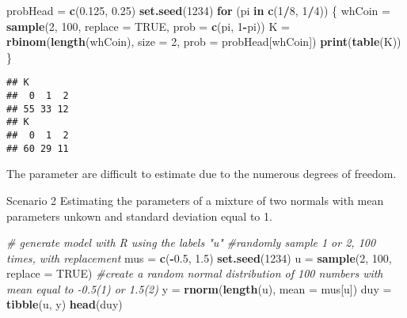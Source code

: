 \documentclass[]{article}
\newenvironment{Shaded}{\begin{snugshade}}{\end{snugshade}}
\newcommand{\CommentTok}[1]{\textcolor[rgb]{0.56,0.35,0.01}{\textit{#1}}}
\newcommand{\ControlFlowTok}[1]{\textcolor[rgb]{0.13,0.29,0.53}{\textbf{#1}}}
\newcommand{\DataTypeTok}[1]{\textcolor[rgb]{0.13,0.29,0.53}{#1}}
\newcommand{\DecValTok}[1]{\textcolor[rgb]{0.00,0.00,0.81}{#1}}
\newcommand{\FloatTok}[1]{\textcolor[rgb]{0.00,0.00,0.81}{#1}}
\newcommand{\KeywordTok}[1]{\textcolor[rgb]{0.13,0.29,0.53}{\textbf{#1}}}
\newcommand{\NormalTok}[1]{#1}
\newcommand{\OperatorTok}[1]{\textcolor[rgb]{0.81,0.36,0.00}{\textbf{#1}}}
\newcommand{\OtherTok}[1]{\textcolor[rgb]{0.56,0.35,0.01}{#1}}
\newcommand{\StringTok}[1]{\textcolor[rgb]{0.31,0.60,0.02}{#1}}
\begin{document}
\begin{Shaded}
\begin{Highlighting}[]
\NormalTok{probHead =}\StringTok{ }\KeywordTok{c}\NormalTok{(}\FloatTok{0.125}\NormalTok{, }\FloatTok{0.25}\NormalTok{)}
\KeywordTok{set.seed}\NormalTok{(}\DecValTok{1234}\NormalTok{)}
\ControlFlowTok{for}\NormalTok{ (pi }\ControlFlowTok{in} \KeywordTok{c}\NormalTok{(}\DecValTok{1}\OperatorTok{/}\DecValTok{8}\NormalTok{, }\DecValTok{1}\OperatorTok{/}\DecValTok{4}\NormalTok{)) \{}
\NormalTok{  whCoin =}\StringTok{ }\KeywordTok{sample}\NormalTok{(}\DecValTok{2}\NormalTok{, }\DecValTok{100}\NormalTok{, }\DataTypeTok{replace =} \OtherTok{TRUE}\NormalTok{, }\DataTypeTok{prob =} \KeywordTok{c}\NormalTok{(pi, }\DecValTok{1}\OperatorTok{-}\NormalTok{pi))}
\NormalTok{  K =}\StringTok{ }\KeywordTok{rbinom}\NormalTok{(}\KeywordTok{length}\NormalTok{(whCoin), }\DataTypeTok{size =} \DecValTok{2}\NormalTok{, }\DataTypeTok{prob =}\NormalTok{ probHead[whCoin])}
  \KeywordTok{print}\NormalTok{(}\KeywordTok{table}\NormalTok{(K))}
\NormalTok{\}}
\end{Highlighting}
\end{Shaded}

\begin{verbatim}
## K
##  0  1  2 
## 55 33 12 
## K
##  0  1  2 
## 60 29 11
\end{verbatim}

The parameter are difficult to estimate due to the numerous degrees of
freedom.

Scenario 2 Estimating the parameters of a mixture of two normals with
mean parameters unkown and standard deviation equal to 1.

\begin{Shaded}
\begin{Highlighting}[]
\CommentTok{# generate  model with R using the labels "u"}
\CommentTok{#randomly sample 1 or 2, 100 times, with replacement}
\NormalTok{mus =}\StringTok{ }\KeywordTok{c}\NormalTok{(}\OperatorTok{-}\FloatTok{0.5}\NormalTok{, }\FloatTok{1.5}\NormalTok{)}
\KeywordTok{set.seed}\NormalTok{(}\DecValTok{1234}\NormalTok{)}
\NormalTok{u =}\StringTok{ }\KeywordTok{sample}\NormalTok{(}\DecValTok{2}\NormalTok{, }\DecValTok{100}\NormalTok{, }\DataTypeTok{replace =} \OtherTok{TRUE}\NormalTok{)}
\CommentTok{#create a random normal distribution of 100 numbers with mean equal to -0.5(1) or 1.5(2)}
\NormalTok{y =}\StringTok{ }\KeywordTok{rnorm}\NormalTok{(}\KeywordTok{length}\NormalTok{(u), }\DataTypeTok{mean =}\NormalTok{ mus[u])}
\NormalTok{duy =}\StringTok{ }\KeywordTok{tibble}\NormalTok{(u, y)}
\KeywordTok{head}\NormalTok{(duy)}
\end{Highlighting}
\end{Shaded}
\end{document}
